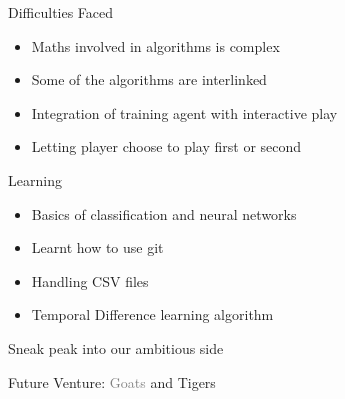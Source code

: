\documentclass[14pt]{beamer}
\begin{document}
\begin{frame}{Difficulties Faced}
    \begin{itemize}
        \item Maths involved in algorithms is complex
        \item Some of the algorithms are interlinked
	\item Integration of training agent with interactive play
        \item Letting player choose to play first or second
    \end{itemize}
\end{frame}

\begin{frame}{Learning}
    \begin{itemize}
        \item Basics of classification and neural networks
        \item Learnt how to use git
        \item Handling CSV files
        \item Temporal Difference learning algorithm
    \end{itemize}
\end{frame}

\begin{frame}{Sneak peak into our ambitious side}
    \begin{center}
        Future Venture: \textcolor{gray}{Goats} and \textcolor{myAmber}{Tigers}
    \end{center}
\end{frame}
\end{document}

